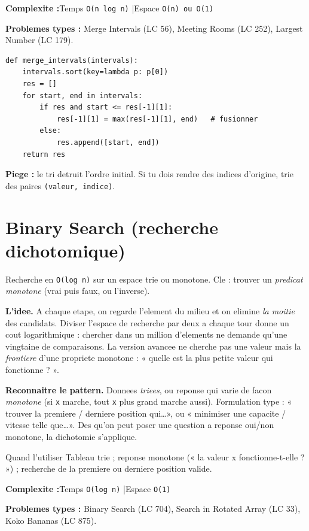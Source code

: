 \documentclass[11pt,a4paper]{article}
\newcommand{\complexite}[2]{%
  \noindent\textbf{Complexite :}\quad Temps \texttt{#1} \quad|\quad Espace \texttt{#2}\par\smallskip}
\newcommand{\leetcode}[1]{\noindent\textbf{Problemes types :} #1\par\medskip}
\begin{document}
\complexite{O(n log n)}{O(n) ou O(1)}
\leetcode{Merge Intervals (LC 56), Meeting Rooms (LC 252), Largest Number (LC 179).}

\begin{lstlisting}
def merge_intervals(intervals):
    intervals.sort(key=lambda p: p[0])
    res = []
    for start, end in intervals:
        if res and start <= res[-1][1]:
            res[-1][1] = max(res[-1][1], end)   # fusionner
        else:
            res.append([start, end])
    return res
\end{lstlisting}

\textbf{Piege :} le tri detruit l'ordre initial. Si tu dois rendre des indices
d'origine, trie des paires \texttt{(valeur, indice)}.

\section{Binary Search (recherche dichotomique)}
Recherche en \texttt{O(log n)} sur un espace trie ou monotone. Cle : trouver un
\emph{predicat monotone} (vrai puis faux, ou l'inverse).

\textbf{L'idee.} A chaque etape, on regarde l'element du milieu et on elimine
\emph{la moitie} des candidats. Diviser l'espace de recherche par deux a chaque
tour donne un cout logarithmique : chercher dans un million d'elements ne demande
qu'une vingtaine de comparaisons. La version avancee ne cherche pas une valeur
mais la \emph{frontiere} d'une propriete monotone : « quelle est la plus petite
valeur qui fonctionne ? ».

\textbf{Reconnaitre le pattern.} Donnees \emph{triees}, ou reponse qui varie de
facon \emph{monotone} (si \texttt{x} marche, tout \texttt{x} plus grand marche
aussi). Formulation type : « trouver la premiere / derniere position qui\ldots »,
ou « minimiser une capacite / vitesse telle que\ldots ». Des qu'on peut poser une
question a reponse oui/non monotone, la dichotomie s'applique.

\begin{infobox}{Quand l'utiliser}
Tableau trie ; reponse monotone (« la valeur x fonctionne-t-elle ? ») ;
recherche de la premiere ou derniere position valide.
\end{infobox}

\complexite{O(log n)}{O(1)}
\leetcode{Binary Search (LC 704), Search in Rotated Array (LC 33), Koko Bananas (LC 875).}
\end{document}
